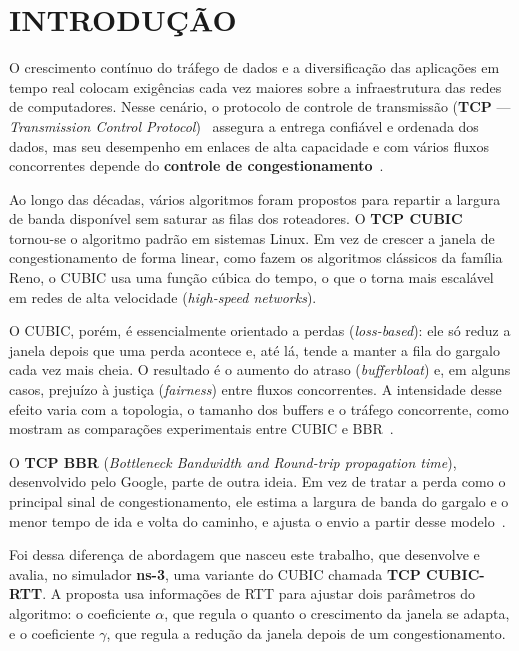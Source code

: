 \chapter{INTRODUÇÃO}
O crescimento contínuo do tráfego de dados e a diversificação das aplicações em tempo real colocam exigências cada vez maiores sobre a infraestrutura das redes de computadores. Nesse cenário, o protocolo de controle de transmissão (\textbf{TCP} --- \textit{Transmission Control Protocol})~\cite{rfc9293} assegura a entrega confiável e ordenada dos dados, mas seu desempenho em enlaces de alta capacidade e com vários fluxos concorrentes depende do \textbf{controle de congestionamento}~\cite{rfc5681}.

Ao longo das décadas, vários algoritmos foram propostos para repartir a largura de banda disponível sem saturar as filas dos roteadores. O \textbf{TCP CUBIC}~\cite{ha2008,rfc9438} tornou-se o algoritmo padrão em sistemas Linux. Em vez de crescer a janela de congestionamento de forma linear, como fazem os algoritmos clássicos da família Reno, o CUBIC usa uma função cúbica do tempo, o que o torna mais escalável em redes de alta velocidade (\textit{high-speed networks}).

O CUBIC, porém, é essencialmente orientado a perdas (\textit{loss-based}): ele só reduz a janela depois que uma perda acontece e, até lá, tende a manter a fila do gargalo cada vez mais cheia. O resultado é o aumento do atraso (\textit{bufferbloat}) e, em alguns casos, prejuízo à justiça (\textit{fairness}) entre fluxos concorrentes. A intensidade desse efeito varia com a topologia, o tamanho dos buffers e o tráfego concorrente, como mostram as comparações experimentais entre CUBIC e BBR~\cite{casas2022,ware2019}.

O \textbf{TCP BBR} (\textit{Bottleneck Bandwidth and Round-trip propagation time}), desenvolvido pelo Google, parte de outra ideia. Em vez de tratar a perda como o principal sinal de congestionamento, ele estima a largura de banda do gargalo e o menor tempo de ida e volta do caminho, e ajusta o envio a partir desse modelo~\cite{cardwell2017}.

Foi dessa diferença de abordagem que nasceu este trabalho, que desenvolve e avalia, no simulador \textbf{ns-3}, uma variante do CUBIC chamada \textbf{TCP CUBIC-RTT}. A proposta usa informações de RTT para ajustar dois parâmetros do algoritmo: o coeficiente $\alpha$, que regula o quanto o crescimento da janela se adapta, e o coeficiente $\gamma$, que regula a redução da janela depois de um congestionamento.

